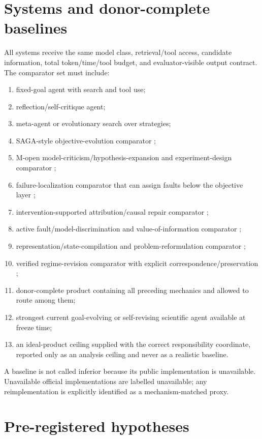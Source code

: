 \documentclass[11pt]{article}
\begin{document}
\section{Systems and donor-complete baselines}
All systems receive the same model class, retrieval/tool access, candidate information, total token/time/tool budget, and evaluator-visible output contract. The comparator set must include:
\begin{enumerate}[leftmargin=*]
    \item fixed-goal agent with search and tool use;
    \item reflection/self-critique agent;
    \item meta-agent or evolutionary search over strategies;
    \item SAGA-style objective-evolution comparator \cite{saga2026};
    \item M-open model-criticism/hypothesis-expansion and experiment-design comparator \cite{mda2026};
    \item failure-localization comparator that can assign faults below the objective layer \cite{modelorharness2026};
    \item intervention-supported attribution/causal repair comparator \cite{reflect2026,architect2026};
    \item active fault/model-discrimination and value-of-information comparator \cite{activefault2019};
    \item representation/state-compilation and problem-reformulation comparator \cite{planningreform2023};
    \item verified regime-revision comparator with explicit correspondence/preservation \cite{selfrevising2026};
    \item donor-complete product containing all preceding mechanics and allowed to route among them;
    \item strongest current goal-evolving or self-revising scientific agent available at freeze time;
    \item an ideal-product ceiling supplied with the correct responsibility coordinate, reported only as an analysis ceiling and never as a realistic baseline.
\end{enumerate}

A baseline is not called inferior because its public implementation is unavailable. Unavailable official implementations are labelled unavailable; any reimplementation is explicitly identified as a mechanism-matched proxy.

\section{Pre-registered hypotheses}
\end{document}
